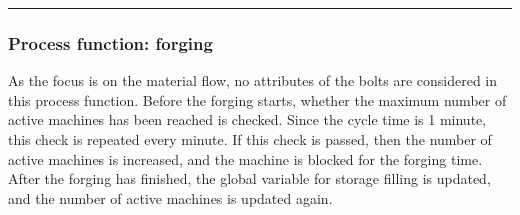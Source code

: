 \documentclass[letterpaper,10pt,english]{sphinxmanual}
\begin{document}
\begin{sphinxVerbatim}[commandchars=\\\{\}]
           

  

       
           
              \PYG{p}{[}\PYG{p}{]}
          

     
\end{sphinxVerbatim}


\bigskip\hrule\bigskip



\subsubsection{Process function: forging}
\label{\detokenize{source/Examples/example03:process-function-forging}}\label{\detokenize{source/Examples/example03:forging}}
\sphinxAtStartPar
As the focus is on the material flow, no attributes of the bolts are considered in this process function. Before the
forging starts, whether the maximum number of active machines has been reached is checked. Since the cycle time is 1
minute, this check is repeated every minute. If this check is passed, then the number of active machines is increased,
and the machine is blocked for the forging time. After the forging has finished, the global variable for storage filling
is updated, and the number of active machines is updated again.
\end{document}
